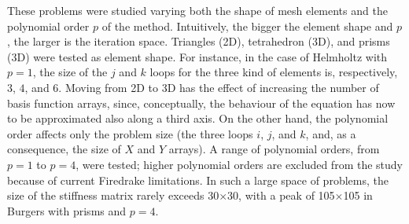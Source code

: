 \documentclass[conference]{IEEEtran}
\begin{document}
These problems were studied varying both the shape of mesh elements and the polynomial order $p$ of the method. Intuitively, the bigger the element shape and $p$, the larger is the iteration space. Triangles (2D), tetrahedron (3D), and prisms (3D) were tested as element shape. For instance, in the case of Helmholtz with $p=1$, the size of the $j$ and $k$ loops for the three kind of elements is, respectively, $3$, $4$, and $6$. Moving from 2D to 3D has the effect of increasing the number of basis function arrays, since, conceptually, the behaviour of the equation has now to be approximated also along a third axis. On the other hand, the polynomial order affects only the problem size (the three loops $i$, $j$, and $k$, and, as a consequence, the size of $X$ and $Y$ arrays). A range of polynomial orders, from $p=1$ to $p=4$, were tested; higher polynomial orders are excluded from the study because of current Firedrake limitations. In such a large space of problems, the size of the stiffness matrix rarely exceeds 30$\times$30, with a peak of 105$\times$105 in Burgers with prisms and $p=4$.
\end{document}
